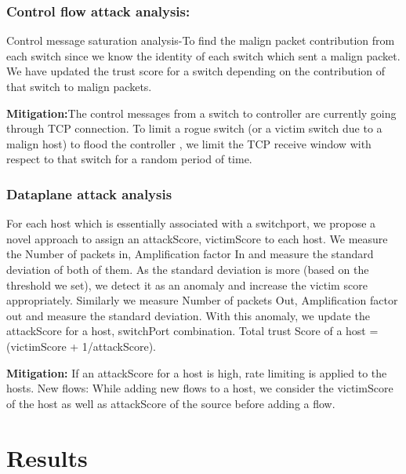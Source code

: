 \documentclass[conference]{IEEEtran}
\begin{document}
\subsubsection{\textbf{Control flow attack analysis:}}
Control message saturation analysis-To find the malign packet contribution from each switch since we know the identity of each switch which sent a malign packet. We have updated the trust score for a switch depending on the contribution of that switch to malign packets.
\par
\textbf{Mitigation:}The control messages from a switch to controller are currently going through TCP connection. To limit a rogue switch (or a victim switch due to a malign host) to flood the controller , we limit the TCP receive window with respect to that switch for a random period of time.

\subsubsection{\textbf{Dataplane attack analysis}}
For each host which is essentially associated with a switchport, we propose a novel approach to assign an attackScore, victimScore to each host. We measure the Number of packets in, Amplification factor In and measure the standard deviation of both of them. As the standard deviation is more (based on the threshold we set), we detect it as an anomaly and increase the victim score appropriately. Similarly we measure Number of packets Out, Amplification factor out and measure the standard deviation. With this anomaly, we update the attackScore for a host, switchPort combination. Total trust Score of a host = (victimScore + 1/attackScore).
\par
\textbf{Mitigation:} If an attackScore for a host is high, rate limiting is applied to the hosts. New flows: While adding new flows to a host, we consider the victimScore of the host as well as attackScore of the source before adding a flow.




\section{\textbf{Results}}
\end{document}
